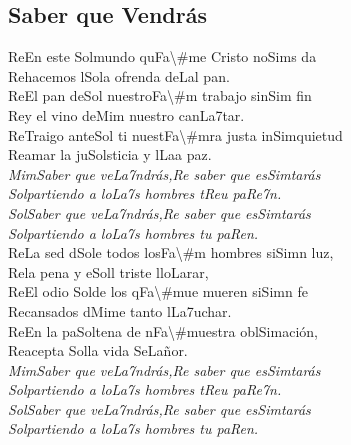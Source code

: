 \subsection{Saber que Vendrás}

\begin{center}

{\Large
\ac{Re}En este \ac{Sol}mundo qu\ac{Fa\#m}e Cristo no\ac{Sim}s da\\
\ac{Re}hacemos l\ac{Sol}a ofrenda de\ac{La}l pan. \\
\ac{Re}El pan de\ac{Sol} nuestro\ac{Fa\#m} trabajo sin\ac{Sim} fin\\ 
\ac{Re}y el vino de\ac{Mim} nuestro can\ac{La7}tar. \\
\ac{Re}Traigo ante\ac{Sol} ti nuest\ac{Fa\#m}ra justa in\ac{Sim}quietud\\ 
\ac{Re}amar la ju\ac{Sol}sticia y l\ac{La}a paz. \\
\vspace{1em}
\textit{\ac{Mim}Saber que ve\ac{La7}ndrás,\ac{Re} saber que es\ac{Sim}tarás} \\
\textit{\ac{Sol}partiendo a lo\ac{La7}s hombres t\ac{Re}u pa\ac{Re7}n.}\\ 
\textit{\ac{Sol}Saber que ve\ac{La7}ndrás,\ac{Re} saber que es\ac{Sim}tarás}\\
\textit{\ac{Sol}partiendo a lo\ac{La7}s hombres tu pa\ac{Re}n.}\\ 
\vspace{1em}
\ac{Re}La sed d\ac{Sol}e todos los\ac{Fa\#m} hombres si\ac{Sim}n luz,\\ 
\ac{Re}la pena y e\ac{Sol}l triste llo\ac{La}rar, \\
\ac{Re}El odio \ac{Sol}de los q\ac{Fa\#m}ue mueren si\ac{Sim}n fe\\ 
\ac{Re}cansados d\ac{Mim}e tanto l\ac{La7}uchar. \\
\ac{Re}En la pa\ac{Sol}tena de n\ac{Fa\#m}uestra obl\ac{Sim}ación,\\ 
\ac{Re}acepta \ac{Sol}la vida Se\ac{La}ñor.\\

\textit{\ac{Mim}Saber que ve\ac{La7}ndrás,\ac{Re} saber que es\ac{Sim}tarás}\\
\textit{\ac{Sol}partiendo a lo\ac{La7}s hombres t\ac{Re}u pa\ac{Re7}n.}\\ 
\textit{\ac{Sol}Saber que ve\ac{La7}ndrás,\ac{Re} saber que es\ac{Sim}tarás}\\
\textit{\ac{Sol}partiendo a lo\ac{La7}s hombres tu pa\ac{Re}n.}
}
\end{center}
